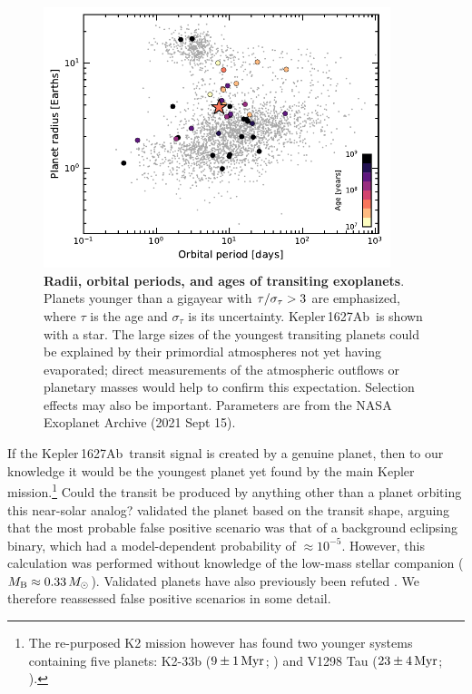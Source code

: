 \documentclass[12pt,modern,twocolumn,tighten,linenumbers,trackchanges]{aastex63}
\newcommand{\pn}{Kepler\,1627Ab} %
\begin{document}
\begin{figure}[!t]
	\begin{center}
		\leavevmode
		\includegraphics[width=0.9\textwidth]{f8.pdf}
	\end{center}
	\vspace{-0.7cm}
	\caption{
		{\bf Radii, orbital periods, and ages of transiting exoplanets}.
		Planets younger than a gigayear with ${\rm \tau}/\sigma_{\tau} >
		3$ are emphasized, where $\tau$ is the age and $\sigma_{\tau}$ is
		its uncertainty.  \pn\ is shown with a star.  The large sizes of
		the youngest transiting planets could be explained by their
		primordial atmospheres not yet having evaporated; direct
		measurements of the atmospheric outflows or planetary masses would
		help to confirm this expectation.  Selection effects may also be
		important.  Parameters are from the NASA Exoplanet Archive (2021
		Sept 15).
		\label{fig:rp_period_age}
	}
\end{figure}

If the \pn\ transit signal is created by a genuine planet,  then to
our knowledge it would be the youngest planet yet found by the main
Kepler mission.\footnote{The re-purposed K2 mission however has found
two younger systems containing five planets: K2-33b ($9\pm1\,{\rm
Myr}$; \citealt{Mann_K2_33b_2016,David_et_al_2017}) and V1298 Tau
($23\pm4\,{\rm Myr}$; \citealt{david_four_2019}).}   Could the transit
be produced by anything other than a planet orbiting this near-solar
analog?  \citet{morton_false_2016} validated the planet based on the
transit shape, arguing that the most probable false positive scenario
was that of a background eclipsing binary, which had a model-dependent
probability of $\approx$$10^{-5}$.  However, this calculation was
performed without knowledge of the low-mass stellar companion ($M_{\rm
B}\approx 0.33\,M_\odot$).  Validated planets have also previously
been refuted \citep[{\it e.g.},][]{shporer_three_2017}.  We therefore
reassessed false positive scenarios in some detail. 
\end{document}
